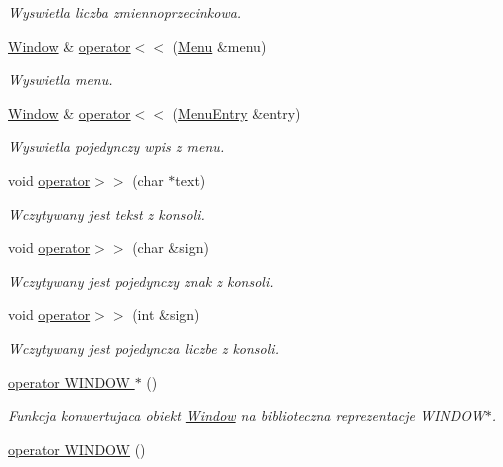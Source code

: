 \begin{DoxyCompactItemize}
\begin{DoxyCompactList}\small\item\em Wyswietla liczba zmiennoprzecinkowa. \end{DoxyCompactList}\item 
\hyperlink{class_window}{Window} \& \hyperlink{class_window_a54ce1a8639b3576063f4267868fb7625}{operator$<$$<$} (\hyperlink{class_menu}{Menu} \&menu)
\begin{DoxyCompactList}\small\item\em Wyswietla menu. \end{DoxyCompactList}\item 
\hyperlink{class_window}{Window} \& \hyperlink{class_window_a93288ef1367a2786c9b813e1964e6477}{operator$<$$<$} (\hyperlink{class_menu_entry}{Menu\+Entry} \&entry)
\begin{DoxyCompactList}\small\item\em Wyswietla pojedynczy wpis z menu. \end{DoxyCompactList}\item 
void \hyperlink{class_window_a7b0cae35f572f46c87033747117bbebd}{operator$>$$>$} (char $\ast$text)
\begin{DoxyCompactList}\small\item\em Wczytywany jest tekst z konsoli. \end{DoxyCompactList}\item 
void \hyperlink{class_window_ad6d4bed0b5d293244bf6fbc348b4456e}{operator$>$$>$} (char \&sign)
\begin{DoxyCompactList}\small\item\em Wczytywany jest pojedynczy znak z konsoli. \end{DoxyCompactList}\item 
void \hyperlink{class_window_a0891167a97154f4f5b5104a06af41805}{operator$>$$>$} (int \&sign)
\begin{DoxyCompactList}\small\item\em Wczytywany jest pojedyncza liczbe z konsoli. \end{DoxyCompactList}\item 
\hyperlink{class_window_a5f2e3efa7b8654cdcf8235ae9f15c6fb}{operator W\+I\+N\+D\+O\+W $\ast$} ()
\begin{DoxyCompactList}\small\item\em Funkcja konwertujaca obiekt \hyperlink{class_window}{Window} na biblioteczna reprezentacje W\+I\+N\+D\+O\+W$\ast$. \end{DoxyCompactList}\item 
\hyperlink{class_window_ab515f51d1827fe02dec95b5ce19f4f14}{operator W\+I\+N\+D\+O\+W} ()

\end{DoxyCompactItemize}
